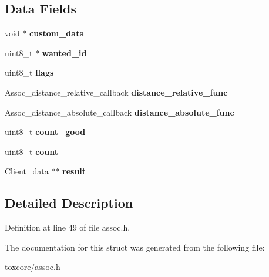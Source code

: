 \subsection*{Data Fields}
\begin{DoxyCompactItemize}
\item 
\hypertarget{struct_assoc__close__entries_a89491b1d291e113f86c1d33a3c1ec66b}{void $\ast$ {\bfseries custom\+\_\+data}}\label{struct_assoc__close__entries_a89491b1d291e113f86c1d33a3c1ec66b}

\item 
\hypertarget{struct_assoc__close__entries_a037b65164e78b02017bd4751843037b4}{uint8\+\_\+t $\ast$ {\bfseries wanted\+\_\+id}}\label{struct_assoc__close__entries_a037b65164e78b02017bd4751843037b4}

\item 
\hypertarget{struct_assoc__close__entries_aa2585d779da0ab21273a8d92de9a0ebe}{uint8\+\_\+t {\bfseries flags}}\label{struct_assoc__close__entries_aa2585d779da0ab21273a8d92de9a0ebe}

\item 
\hypertarget{struct_assoc__close__entries_ada046356cf0fe3d4a2c18ac174d5eb0e}{Assoc\+\_\+distance\+\_\+relative\+\_\+callback {\bfseries distance\+\_\+relative\+\_\+func}}\label{struct_assoc__close__entries_ada046356cf0fe3d4a2c18ac174d5eb0e}

\item 
\hypertarget{struct_assoc__close__entries_aedd1522117fb10fb74c7054f25f2d282}{Assoc\+\_\+distance\+\_\+absolute\+\_\+callback {\bfseries distance\+\_\+absolute\+\_\+func}}\label{struct_assoc__close__entries_aedd1522117fb10fb74c7054f25f2d282}

\item 
\hypertarget{struct_assoc__close__entries_a086e0ce002c9491e4b99956740bb53d4}{uint8\+\_\+t {\bfseries count\+\_\+good}}\label{struct_assoc__close__entries_a086e0ce002c9491e4b99956740bb53d4}

\item 
\hypertarget{struct_assoc__close__entries_a20302e2c99a60d3f612dba57e3f6333b}{uint8\+\_\+t {\bfseries count}}\label{struct_assoc__close__entries_a20302e2c99a60d3f612dba57e3f6333b}

\item 
\hypertarget{struct_assoc__close__entries_a40d6704f891338dadfa89f46b696be4c}{\hyperlink{struct_client__data}{Client\+\_\+data} $\ast$$\ast$ {\bfseries result}}\label{struct_assoc__close__entries_a40d6704f891338dadfa89f46b696be4c}

\end{DoxyCompactItemize}


\subsection{Detailed Description}


Definition at line 49 of file assoc.\+h.



The documentation for this struct was generated from the following file\+:\begin{DoxyCompactItemize}
\item 
toxcore/assoc.\+h\end{DoxyCompactItemize}
